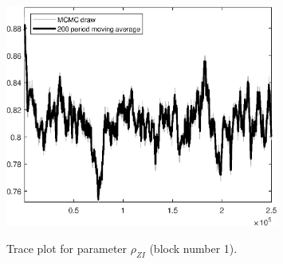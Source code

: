 \begin{figure}[H]
\centering
  \includegraphics[width=0.8\textwidth]{BRS_fd/graphs/TracePlot_rho_ZI_blck_1}\\
    \caption{Trace plot for parameter ${\rho_{ZI}}$ (block number 1).}
\end{figure}
